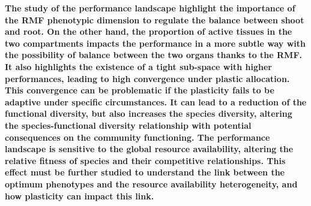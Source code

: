 %
%
%

\textbf{The study of the performance landscape highlight the importance of the RMF phenotypic dimension to regulate the balance between shoot and root. On the other hand, the proportion of active tissues in the two compartments impacts the performance in a more subtle way with the possibility of balance between the two organs thanks to the RMF. It also highlights the existence of a tight sub-space with higher performances, leading to high convergence under plastic allocation. This convergence can be problematic if the plasticity fails to be adaptive under specific circumstances. It can lead to a reduction of the functional diversity, but also increases the species diversity, altering the species-functional diversity relationship with potential consequences on the community functioning. The performance landscape is sensitive to the global resource availability, altering the relative fitness of species and their competitive relationships. This effect must be further studied to understand the link between the optimum phenotypes and the resource availability heterogeneity, and how plasticity can impact this link. }



